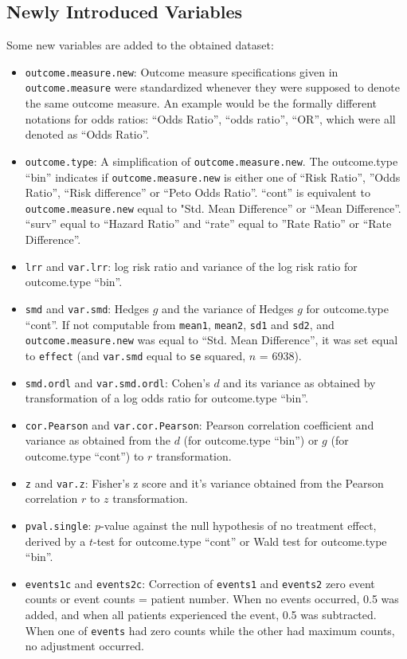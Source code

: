 \documentclass[11pt,a4paper,twoside]{book}\usepackage[]{graphicx}\usepackage[]{color}
\begin{document}
\subsection{Newly Introduced Variables}
Some new variables are added to the obtained dataset:
\begin{itemize}
\item \texttt{outcome.measure.new}: Outcome measure specifications given in \texttt{outcome.measure} were standardized whenever they were supposed to denote the same outcome measure. An example would be the formally different notations for odds ratios: ``Odds Ratio'', ``odds ratio'', ``OR'', which were all denoted as ``Odds Ratio''.
\item \texttt{outcome.type}: A simplification of \texttt{outcome.measure.new}. The outcome.type ``bin'' indicates if \texttt{outcome.measure.new} is either one of ``Risk Ratio'', ''Odds Ratio'', ``Risk difference'' or ``Peto Odds Ratio''. ``cont'' is equivalent to \texttt{outcome.measure.new} equal to "Std. Mean Difference'' or ``Mean Difference''. ``surv'' equal to ``Hazard Ratio'' and ``rate'' equal to ''Rate Ratio'' or ``Rate Difference''.
\item \texttt{lrr} and \texttt{var.lrr}: log risk ratio and variance of the log risk ratio for outcome.type ``bin''.
\item \texttt{smd} and \texttt{var.smd}: Hedges $g$ and the variance of Hedges $g$ for outcome.type ``cont''. If not computable from \texttt{mean1}, \texttt{mean2}, \texttt{sd1} and \texttt{sd2}, and \texttt{outcome.measure.new} was equal to ``Std. Mean Difference'', it was set equal to \texttt{effect} (and \texttt{var.smd} equal to \texttt{se} squared, $n$ =  6938).
\item \texttt{smd.ordl} and \texttt{var.smd.ordl}: Cohen's $d$ and its variance as obtained by transformation of a log odds ratio for outcome.type ``bin''.
\item \texttt{cor.Pearson} and \texttt{var.cor.Pearson}: Pearson correlation coefficient and variance as obtained from the $d$ (for outcome.type ``bin'') or $g$ (for outcome.type ``cont'') to $r$ transformation.
\item \texttt{z} and \texttt{var.z}: Fisher's z score and it's variance obtained from the Pearson correlation $r$ to $z$ transformation.
\item \texttt{pval.single}: $p$-value against the null hypothesis of no treatment effect, derived by a $t$-test for outcome.type ``cont'' or Wald test for outcome.type ``bin''.
\item \texttt{events1c} and \texttt{events2c}: Correction of \texttt{events1} and \texttt{events2} zero event counts or event counts = patient number. When no events occurred, 0.5 was added, and when all patients experienced the event, 0.5 was subtracted. When one of \texttt{events} had zero counts while the other had maximum counts, no adjustment occurred.

\end{itemize}
\end{document}
